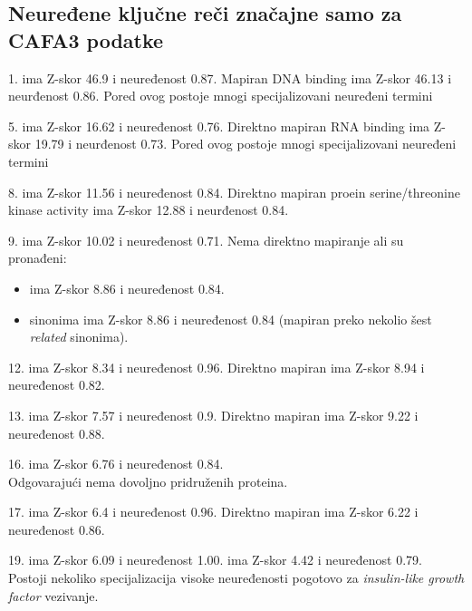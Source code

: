 \subsection{ Neuređene ključne reči značajne samo za CAFA3 podatke}

1.  ima Z-skor 46.9 i neuređenost 0.87.
Mapiran {DNA binding} ima Z-skor 46.13 i neurđenost 0.86.
Pored ovog postoje mnogi specijalizovani neuređeni termini

5.  ima Z-skor 16.62 i neuređenost 0.76.
Direktno mapiran {RNA binding} ima Z-skor 19.79 i neurđenost 0.73.
Pored ovog postoje mnogi specijalizovani neuređeni termini

8.  ima Z-skor 11.56 i neuređenost 0.84.
Direktno mapiran {proein serine/threonine kinase activity} ima Z-skor 12.88 i neurđenost 0.84.

9.  ima Z-skor 10.02 i neuređenost 0.71.
Nema direktno mapiranje ali su pronađeni:
\begin{itemize}
  \item {} ima Z-skor 8.86 i neuređenost 0.84.
  \item {} sinonima ima Z-skor 8.86 i neuređenost 0.84 (mapiran preko nekolio šest \textit{related} sinonima).
\end{itemize}

12.  ima Z-skor 8.34 i neuređenost 0.96.
Direktno mapiran  ima Z-skor 8.94 i neuređenost 0.82.

13.  ima Z-skor 7.57 i neuređenost 0.9.
Direktno mapiran  ima Z-skor 9.22 i neuređenost 0.88.

16.  ima Z-skor 6.76 i neuređenost 0.84.
\\ Odgovarajući  nema dovoljno pridruženih proteina.

17.  ima Z-skor 6.4 i neuređenost 0.96.
Direktno mapiran  ima Z-skor 6.22 i neuređenost 0.86.

19.  ima Z-skor 6.09 i neuređenost 1.00.
 ima Z-skor 4.42 i neuređenost 0.79. Postoji
nekoliko specijalizacija visoke neuređenosti pogotovo za
\textit{insulin-like growth factor} vezivanje.



